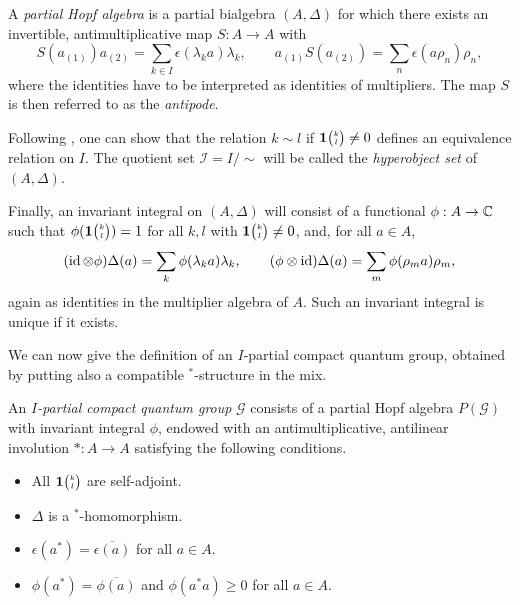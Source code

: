 
A \emph{partial Hopf algebra} \cite[Definition 1.7]{DCT1} is a partial bialgebra $(A,\Delta)$ for which there exists an invertible, antimultiplicative map $S: A\rightarrow A$ with \[S(a_{(1)})a_{(2)} = \sum_{k\in I} \epsilon(\lambda_ka)\lambda_k,\qquad a_{(1)}S(a_{(2)}) = \sum_n\epsilon(a\rho_n)\rho_n,\] where the identities have to be interpreted as identities of multipliers. The map $S$ is then referred to as the \emph{antipode}. 

Following \cite[Definition 1.8]{DCT1}, one can show that the relation $k\sim l$ if $\mathbf{1}{\tiny {\begin{pmatrix} k\\l\end{pmatrix}}}\neq0$ defines an equivalence relation on $I$. The quotient set $\mathscr{I} = I/\sim$ will be called the \emph{hyperobject set} of $(A,\Delta)$.

Finally, an invariant integral on $(A,\Delta)$ \cite[Definition 1.12]{DCT1} will consist of a functional $\phi: A\rightarrow \mathbb{C}$ such that $\phi(\mathbf{1}{\tiny {\begin{pmatrix} k\\l\end{pmatrix}}})=1$ for all $k,l$ with $\mathbf{1}{\tiny {\begin{pmatrix} k\\l\end{pmatrix}}}\neq 0$, and, for all $a\in A$, \[(\operatorname{id}\otimes \phi)\Delta(a) = \sum_{k} \phi(\lambda_k a)\lambda_k,\qquad (\phi\otimes \operatorname{id})\Delta(a) = \sum_m \phi(\rho_m a)\rho_m,\] again as identities in the multiplier algebra of $A$. Such an invariant integral is unique if it exists.

We can now give the definition of an $I$-partial compact quantum group, obtained by putting also a compatible $^*$-structure in the mix.

\begin{Def} An \emph{$I$-partial compact quantum group} $\mathscr{G}$ consists of a partial Hopf algebra $P(\mathscr{G})$ with invariant integral $\phi$, endowed with an antimultiplicative, antilinear involution $*:A\rightarrow A$ satisfying the following conditions.
\begin{itemize}
\item All $\mathbf{1}{\tiny {\begin{pmatrix} k\\l\end{pmatrix}}}$ are self-adjoint.
\item $\Delta$ is a $^*$-homomorphism.
\item $\epsilon(a^*) = \overline{\epsilon(a)}$ for all $a\in A$. 
\item $\phi(a^*) = \overline{\phi(a)}$ and $\phi(a^*a)\geq 0$ for all $a\in A$.
\end{itemize}
\end{Def} 

